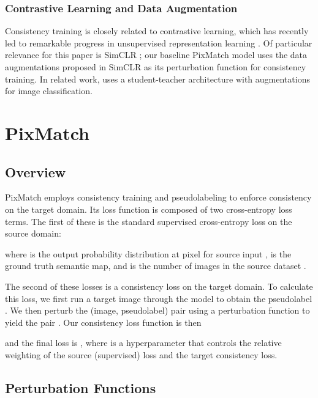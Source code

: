 \documentclass[final]{cvpr}
\begin{document}
\subsubsection{Contrastive Learning and Data Augmentation}

Consistency training is closely related to contrastive learning, which has recently led to remarkable progress in unsupervised representation learning \cite{moco,simclr}. 
Of particular relevance for this paper is SimCLR \cite{simclr}; our baseline PixMatch model uses the data augmentations proposed in SimCLR as its perturbation function for consistency training. 
In related work, \cite{french2018selfensembling} uses a student-teacher architecture with augmentations for image classification. 





\section{PixMatch}

\subsection{Overview}

PixMatch employs consistency training and pseudolabeling to enforce consistency on the target domain. Its loss function is composed of two cross-entropy loss terms. The first of these is the standard supervised cross-entropy loss on the source domain:

where  is the output probability distribution at pixel  for source input ,  is the ground truth semantic map, and  is the number of images in the source dataset .

The second of these losses is a consistency loss on the target domain. To calculate this loss, we first run a target image  through the model to obtain the pseudolabel . We then perturb the (image, pseudolabel) pair using a perturbation function to yield the pair . Our consistency loss function is then 

and the final loss is , where  is a hyperparameter that controls the relative weighting of the source (supervised) loss and the target consistency loss.


\subsection{Perturbation Functions}
\end{document}
